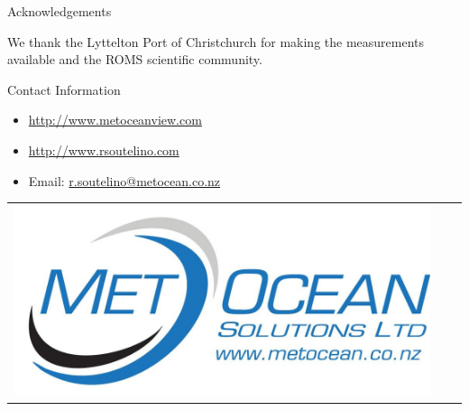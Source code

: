 \documentclass[final]{beamer}
\newlength{\onecolwid}
\begin{document}
\begin{frame}[t]
\begin{columns}[t]
\begin{column}{\onecolwid}




    \begin{block}{Acknowledgements}

    \small{We thank the Lyttelton Port of Christchurch for making the measurements available and the ROMS scientific community. } \\

    \end{block}



    \begin{block}{Contact Information}

    \begin{small}
    \begin{itemize}
    \item \href{http://www.metoceanview.com}{http://www.metoceanview.com}
    \item \href{http://www.rsoutelino.com}{http://www.rsoutelino.com}
    \item Email: \href{mailto:r.soutelino@metocean.co.nz}{r.soutelino@metocean.co.nz}
    \end{itemize}
    \end{small}

    \end{block}

    \begin{center}
    \begin{tabular}{ccc}
    \includegraphics[width=0.7\linewidth]{msllogo.jpg}
    \end{tabular}
    \end{center}


\end{column}
\end{columns}
\end{frame}
\end{document}
